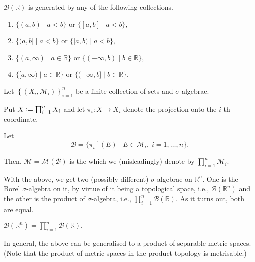\documentclass[12pt]{article}	%
\begin{document}
\begin{prop}
	$\mathcal{B}(\mathbb{R})$ is generated by any of the following collections.
	\begin{enumerate}
		\item $\{(a, b) \mid a < b\}$ or $\{[a, b] \mid a < b\},$
		\item $\{(a, b] \mid a < b\}$ or $\{[a, b) \mid a < b\},$
		\item $\{(a, \infty) \mid a \in \mathbb{R}\}$ or $\{(-\infty, b) \mid b \in \mathbb{R}\},$
		\item $\{[a, \infty) \mid a \in \mathbb{R}\}$ or $\{(-\infty, b] \mid b \in \mathbb{R}\}.$
	\end{enumerate}
\end{prop}

\begin{defn}
	Let $\left\{(X_i, \mathcal{M}_i)\right\}_{i = 1}^n$ be a finite collection of sets and $\sigma$-algebrae. 

	Put $X \vcentcolon= \prod_{i = 1}^{n} X_i$ and let $\pi_i : X \to X_i$ denote the projection onto the $i$-th coordinate.

	Let
	\begin{equation*} 
		\mathcal{B} = \{\pi_i^{-1}(E) \mid E \in \mathcal{M}_i,\; i = 1, \ldots, n\}.
	\end{equation*}

	Then, $\mathcal{M} = \mathcal{M}(\mathcal{B})$ is the  which we (misleadingly) denote by $\prod_{i = 1}^{n}\mathcal{M}_i.$
\end{defn}

With the above, we get two (possibly different) $\sigma$-algebrae on $\mathbb{R}^n.$ One is the Borel $\sigma$-algebra on it, by virtue of it being a topological space, i.e., $\mathcal{B}(\mathbb{R}^n)$ and the other is the product of $\sigma$-algebra, i.e., $\prod_{i = 1}^n \mathcal{B}(\mathbb{R}).$ As it turns out, both are equal.

\begin{thm}
	$\mathcal{B}(\mathbb{R}^n) = \prod_{i = 1}^{n}\mathcal{B}(\mathbb{R}).$
\end{thm}

\begin{rem}
	In general, the above can be generalised to a product of separable metric spaces. (Note that the product of metric spaces in the product topology is metrisable.)
\end{rem}
\end{document}
